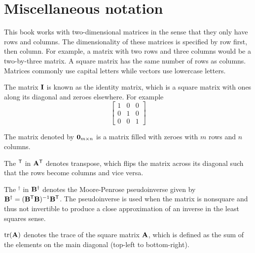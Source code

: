 \section{Miscellaneous notation}

This book works with two-dimensional matrices in the sense that they only have
rows and columns. The dimensionality of these matrices is specified by row
first, then column. For example, a matrix with two rows and three columns would
be a two-by-three matrix. A square matrix has the same number of rows as
columns. Matrices commonly use capital letters while vectors use lowercase
letters.

The matrix $\mathbf{I}$ is known as the identity matrix, which is a square matrix
with ones along its diagonal and zeroes elsewhere. For example
\begin{equation*}
  \begin{bmatrix}
    1 & 0 & 0 \\
    0 & 1 & 0 \\
    0 & 0 & 1
  \end{bmatrix}
\end{equation*}

The matrix denoted by $\mathbf{0}_{m \times n}$ is a matrix filled with zeroes with
$m$ rows and $n$ columns.

The $^\mathsf{T}$ in $\mathbf{A}^\mathsf{T}$ denotes transpose, which flips the matrix across its
diagonal such that the rows become columns and vice versa.

The $^\dagger$ in $\mathbf{B}^\dagger$ denotes the Moore-Penrose pseudoinverse
given by $\mathbf{B}^\dagger = (\mathbf{B}^\mathsf{T}\mathbf{B})^{-1}\mathbf{B}^\mathsf{T}$. The pseudoinverse
is used when the matrix is nonsquare and thus not invertible to produce a close
approximation of an inverse in the least squares sense.

$\operatorname{tr}(\mathbf{A})$ denotes the trace of the square matrix $\mathbf{A}$, which is
defined as the sum of the elements on the main diagonal (top-left to
bottom-right).
